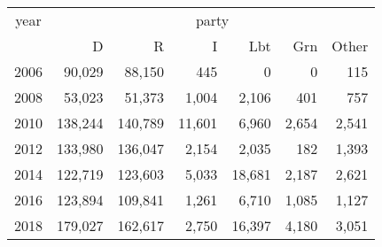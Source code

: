 \footnotesize\begin{tabular}[t]{lrrrrrr}
\toprule
\multicolumn{1}{c}{year} & \multicolumn{6}{c}{party} \\
\cmidrule(l{3pt}r{3pt}){1-1} \cmidrule(l{3pt}r{3pt}){2-7}
  & D & R & I & Lbt & Grn & Other\\
\midrule
2006 & 90,029 & 88,150 & 445 & 0 & 0 & 115\\
2008 & 53,023 & 51,373 & 1,004 & 2,106 & 401 & 757\\
2010 & 138,244 & 140,789 & 11,601 & 6,960 & 2,654 & 2,541\\
2012 & 133,980 & 136,047 & 2,154 & 2,035 & 182 & 1,393\\
2014 & 122,719 & 123,603 & 5,033 & 18,681 & 2,187 & 2,621\\
2016 & 123,894 & 109,841 & 1,261 & 6,710 & 1,085 & 1,127\\
2018 & 179,027 & 162,617 & 2,750 & 16,397 & 4,180 & 3,051\\
\bottomrule
\end{tabular}
